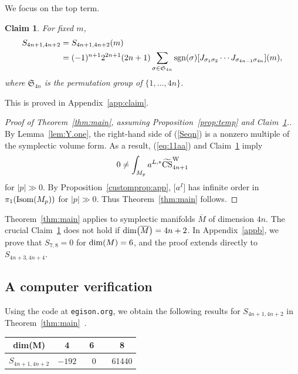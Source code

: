 \documentclass[pdftex]{sigma}
\numberwithin{equation}{section}
\newtheorem{Claim}[Theorem]{Claim}
\theoremstyle{definition}
\newcommand{\ocs}{\widetilde{{\rm CS}}}
\newcommand{\sgn}{{\rm sgn}}
\newcommand{\om}{\overline{M}}
\newcommand{\omp}{M_p}
\newcommand{\isom}{{\rm Isom}}
\begin{document}
We focus on the top term.

\begin{Claim}\label{claim1}
For fixed $m$,
\begin{align}
S_{4n+1,4n+2} &= S_{4n+1,4n+2}(m) \nonumber\\
&=(-1)^{n+1} 2^{2n+1}(2n+1)
\sum_{\sigma \in \mathfrak S_{4n}} \sgn(\sigma) [J_{\sigma_1 \sigma_2} \cdots J_{\sigma_{4n-1} \sigma_{4n}} ](m),\label{Seqn}
\end{align}
where $\mathfrak S_{4n}$ is the permutation group of $\{1,\dots, 4n\}$.
\end{Claim}

This is proved in Appendix~\ref{app:claim}.

\begin{proof}[Proof of Theorem~\ref{thm:main}, assuming Proposition~\ref{prop:temp} and Claim~\ref{claim1}.]
By Lem\-ma~\ref{lem:Y.one}, the \linebreak right-hand side of (\ref{Seqn}) is a nonzero multiple of the symplectic volume form.
As a result, (\ref{eq:11aa}) and Claim~\ref{claim1} imply
\[0\neq \int_{\omp}a^{L,*}\ocs^{\rm W}_{4n+1}\]
for $|p| \gg 0$.
By Proposition~\ref{customprop:app}, $\bigl[a^I\bigr]$ has infinite order in $\pi_1(\isom(\omp))$ for $|p| \gg 0$.
Thus Theorem~\ref{thm:main} follows.
\end{proof}

Theorem~\ref{thm:main} applies to symplectic manifolds $\om$ of dimension $4n$. The crucial Claim~\ref{claim1} does not hold if ${\rm dim}\bigl(\om\bigr) = 4n+2$. In Appendix~\ref{appb}, we prove that $S_{7,8} = 0$ for ${\rm dim}(M) = 6$, and the proof extends directly to $S_{4n+3, 4n+4}$.

\subsection{A computer verification}\label{section3.2}

Using the code at {\tt egison.org}, we obtain the following results for
$S_{4n+1, 4n+2}$
in Theorem~\ref{thm:main}~\cite{Egi1}.

\begin{center}\begin{tabular}{|c||c|c|c|}
\hline
dim(M) & 4&\ 6\ \ &8\\
\hline
$S_{4n+1,4n+2}$ & $-192$&0 &61440\\
\hline
\end{tabular}
\end{center}
\end{document}
